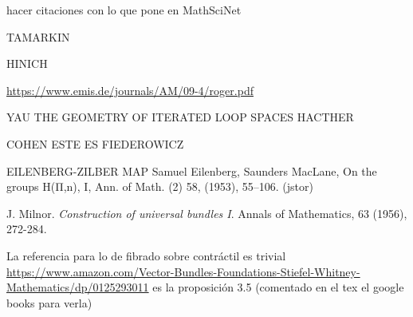 \documentclass[TFM.tex]{subfiles}
\begin{document}
%


\begin{thebibliography}{}






 hacer citaciones con lo que pone en MathSciNet

 TAMARKIN

 HINICH

 \url{https://www.emis.de/journals/AM/09-4/roger.pdf}





 YAU
 THE GEOMETRY OF ITERATED LOOP SPACES
 HACTHER

 COHEN
 ESTE ES FIEDEROWICZ

 EILENBERG-ZILBER MAP Samuel Eilenberg, Saunders MacLane, On the groups H(Π,n), I, Ann. of Math. (2) 58, (1953), 55–106. (jstor)


 J. Milnor. \emph{Construction of universal bundles I}. Annals of Mathematics, 63 (1956), 272-284. 

 La referencia para lo de fibrado sobre contráctil es trivial \url{https://www.amazon.com/Vector-Bundles-Foundations-Stiefel-Whitney-Mathematics/dp/0125293011} es la proposición 3.5 (comentado en el tex el google books para verla) %
\end{thebibliography}
\end{document}
